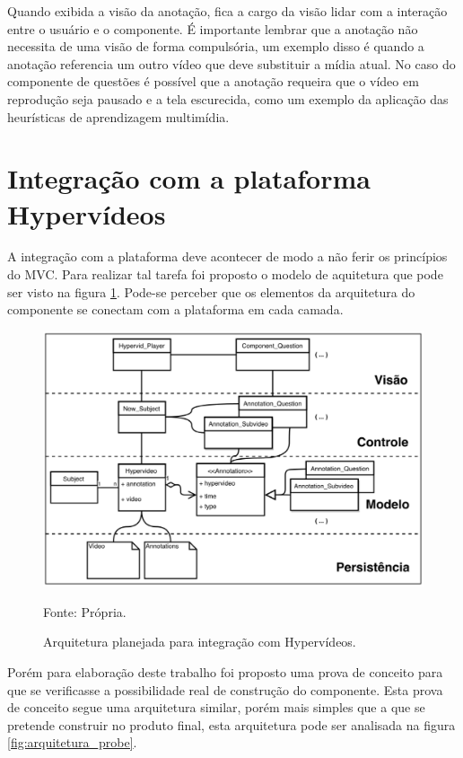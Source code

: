 Quando exibida a visão da anotação, fica a cargo da visão lidar com a interação entre o usuário e o componente. É importante lembrar que a anotação não necessita de uma visão de forma compulsória, um exemplo disso é quando a anotação referencia um outro vídeo que deve substituir a mídia atual. No caso do componente de questões é possível que a anotação requeira que o vídeo em reprodução seja pausado e a tela escurecida, como um exemplo da aplicação das heurísticas de aprendizagem multimídia.

\section{Integração com a plataforma Hypervídeos}

A integração com a plataforma deve acontecer de modo a não ferir os princípios do MVC. Para realizar tal tarefa foi proposto o modelo de aquitetura que pode ser visto na figura \ref{fig:arquitetura_final}. Pode-se perceber que os elementos da arquitetura do componente se conectam com a plataforma em cada camada. 

\begin{figure}[h!]
	\centering
  	\includegraphics[width=.7\linewidth]{figuras/arquitetura.eps}
  	\caption{Arquitetura planejada para integração com Hypervídeos.}
	\small{Fonte: Própria.}
  	\label{fig:arquitetura_final}
\end{figure}

Porém para elaboração deste trabalho foi proposto uma prova de conceito para que se verificasse a possibilidade real de construção do componente. Esta prova de conceito segue uma arquitetura similar, porém mais simples que a que se pretende construir no produto final, esta arquitetura pode ser analisada na figura \ref{fig:arquitetura_probe}. 

